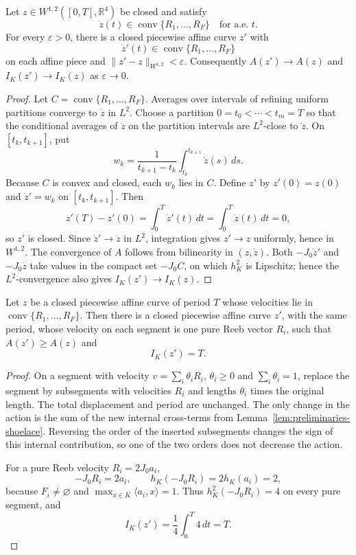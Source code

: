 \begin{lemma}\label{lem:generalized-reeb-pw-affine-approx}
Let \(z\in W^{1,2}([0,T],\mathbb{R}^4)\) be closed and satisfy
\[
  \dot z(t)\in\operatorname{conv}\{R_1,\ldots,R_F\}
  \quad\text{for a.e. }t.
\]
For every \(\varepsilon>0\), there is a closed piecewise affine curve \(z'\)
with
\[
  \dot z'(t)\in\operatorname{conv}\{R_1,\ldots,R_F\}
\]
on each affine piece and \(\|z'-z\|_{W^{1,2}}<\varepsilon\). Consequently
\(A(z')\to A(z)\) and \(I_K(z')\to I_K(z)\) as \(\varepsilon\to0\).
\end{lemma}

\begin{proof}
Let \(C=\operatorname{conv}\{R_1,\ldots,R_F\}\). Averages over intervals of refining uniform partitions converge to
\(\dot z\) in \(L^2\). Choose a partition \(0=t_0<\cdots<t_m=T\) so that the conditional averages of
\(\dot z\) on the partition intervals are \(L^2\)-close to \(\dot z\). On
\([t_k,t_{k+1}]\), put
\[
  w_k=\frac{1}{t_{k+1}-t_k}\int_{t_k}^{t_{k+1}}\dot z(s)\,ds.
\]
Because \(C\) is convex and closed, each \(w_k\) lies in \(C\). Define \(z'\)
by \(z'(0)=z(0)\) and \(\dot z'=w_k\) on \([t_k,t_{k+1}]\). Then
\[
  z'(T)-z'(0)=\int_0^T\dot z'(t)\,dt=\int_0^T\dot z(t)\,dt=0,
\]
so \(z'\) is closed. Since \(\dot z'\to\dot z\) in \(L^2\), integration gives
\(z'\to z\) uniformly, hence in \(W^{1,2}\). The convergence of \(A\) follows
from bilinearity in \((z,\dot z)\). Both \(-J_0\dot z'\) and
\(-J_0\dot z\) take values in the compact set \(-J_0C\), on which
\(h_K^2\) is Lipschitz; hence the
\(L^2\)-convergence also gives \(I_K(z')\to I_K(z)\).
\end{proof}

\begin{lemma}\label{lem:generalized-reeb-splitting}
Let \(z\) be a closed piecewise affine curve of period \(T\) whose velocities
lie in \(\operatorname{conv}\{R_1,\ldots,R_F\}\). Then there is a closed
piecewise affine curve \(z'\), with the same period, whose velocity on each
segment is one pure Reeb vector \(R_i\), such that \(A(z')\geq A(z)\) and
\[
  I_K(z')=T.
\]
\end{lemma}

\begin{proof}
On a segment with velocity \(v=\sum_i\theta_iR_i\), \(\theta_i\ge0\) and
\(\sum_i\theta_i=1\), replace the segment by subsegments with velocities
\(R_i\) and lengths \(\theta_i\) times the original length. The total
displacement and period are unchanged. The only change in the action is the
sum of the new internal cross-terms from
Lemma~\ref{lem:preliminaries-shoelace}. Reversing the order of the inserted
subsegments changes the sign of this internal contribution, so one of the two
orders does not decrease the action.

For a pure Reeb velocity \(R_i=2J_0a_i\),
\[
  -J_0R_i=2a_i,
  \qquad
  h_K(-J_0R_i)=2h_K(a_i)=2,
\]
because \(F_i\neq\varnothing\) and \(\max_{x\in K}\langle a_i,x\rangle=1\).
Thus \(h_K^2(-J_0R_i)=4\) on every pure segment, and
\[
  I_K(z')=\frac14\int_0^T4\,dt=T.
\]
\end{proof}

